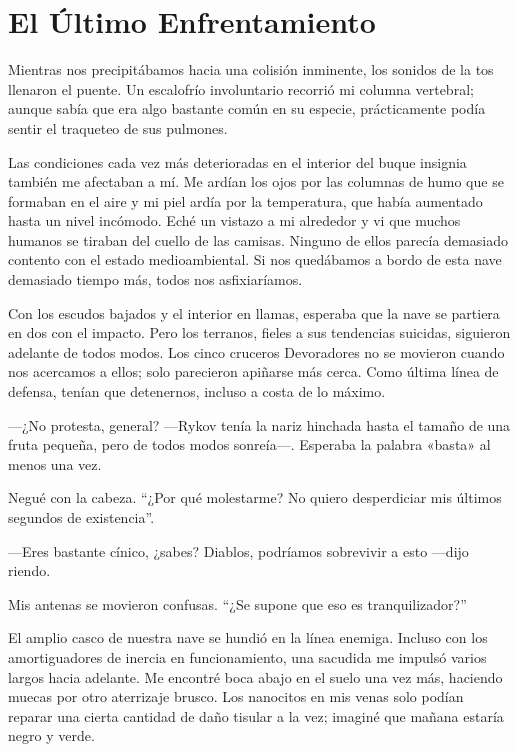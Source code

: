 \chapter{El Último Enfrentamiento}\label{sec:el-ultimo-enfrentamiento}

Mientras nos precipitábamos hacia una colisión inminente, los sonidos de la tos llenaron el puente. Un escalofrío involuntario recorrió mi columna vertebral; aunque sabía que era algo bastante común en su especie, prácticamente podía sentir el traqueteo de sus pulmones.

Las condiciones cada vez más deterioradas en el interior del buque insignia también me afectaban a mí. Me ardían los ojos por las columnas de humo que se formaban en el aire y mi piel ardía por la temperatura, que había aumentado hasta un nivel incómodo. Eché un vistazo a mi alrededor y vi que muchos humanos se tiraban del cuello de las camisas. Ninguno de ellos parecía demasiado contento con el estado medioambiental. Si nos quedábamos a bordo de esta nave demasiado tiempo más, todos nos asfixiaríamos.

Con los escudos bajados y el interior en llamas, esperaba que la nave se partiera en dos con el impacto. Pero los terranos, fieles a sus tendencias suicidas, siguieron adelante de todos modos. Los cinco cruceros Devoradores no se movieron cuando nos acercamos a ellos; solo parecieron apiñarse más cerca. Como última línea de defensa, tenían que detenernos, incluso a costa de lo máximo.

—¿No protesta, general? —Rykov tenía la nariz hinchada hasta el tamaño de una fruta pequeña, pero de todos modos sonreía—. Esperaba la palabra «basta» al menos una vez.

Negué con la cabeza. ``¿Por qué molestarme? No quiero desperdiciar mis últimos segundos de existencia''.

—Eres bastante cínico, ¿sabes? Diablos, podríamos sobrevivir a esto —dijo riendo.

Mis antenas se movieron confusas. ``¿Se supone que eso es tranquilizador?''


El amplio casco de nuestra nave se hundió en la línea enemiga. Incluso con los amortiguadores de inercia en funcionamiento, una sacudida me impulsó varios largos hacia adelante. Me encontré boca abajo en el suelo una vez más, haciendo muecas por otro aterrizaje brusco. Los nanocitos en mis venas solo podían reparar una cierta cantidad de daño tisular a la vez; imaginé que mañana estaría negro y verde.

